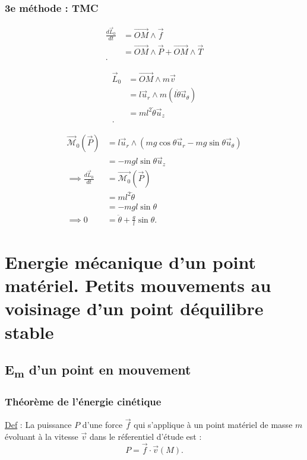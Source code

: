 \documentclass{article}
\begin{document}
\subsubsection{3e méthode : TMC}

\begin{align*}
    \frac{d\vec{L}_0}{dt} &= \vec{OM}\wedge \vec{f} \\
    &= \vec{OM} \wedge \vec{P} + \vec{OM}\wedge \vec{T} \\
.\end{align*}

\begin{align*}
    \vec{L}_0 &= \vec{OM} \wedge m\vec{v} \\
    &= l\vec{u}_r \wedge m(l\dot{\theta}\vec{u}_\theta) \\
    &= ml^2\dot{\theta}\vec{u}_z \\
.\end{align*}

\begin{align*}
    \vec{\mathcal{M}}_0(\vec{P}) &= l\vec{u}_r\wedge (mg\cos\theta \vec{u}_r -mg\sin\theta \vec{u}_\theta) \\
    &= -mgl\sin\theta \vec{u}_z\\
    \implies \frac{d\vec{L}_0}{dt} &= \vec{\mathcal{M}_0}(\vec{P}) \\
    &= ml^2\ddot{\theta} \\
    &= -mgl\sin \theta \\
    \implies 0&= \ddot{\theta} + \frac{g}{l}\sin\theta
.\end{align*}

\section{Energie mécanique d'un point matériel. Petits mouvements au voisinage d'un point déquilibre stable}

\subsection{E\textsubscript{m} d'un point en mouvement}
\subsubsection{Théorème de l'énergie cinétique}

\underline{Def} : La puissance \(P\) d'une force \(\vec{f}\) qui s'applique à un point matériel de masse \(m\) évoluant à la vitesse \(\vec{v}\) dans le réferentiel d'étude est : \\
\[
P = \vec{f}\cdot \vec{v} (M)
.\] 
\end{document}

